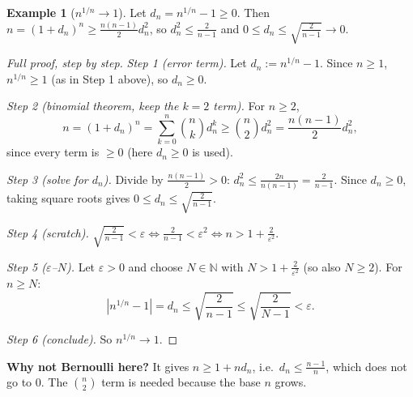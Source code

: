 \documentclass[11pt]{article}
\theoremstyle{definition}
\newtheorem{ex}[defn]{Example}
\newcommand{\N}{\mathbb{N}}
\newcommand{\eps}{\varepsilon}
\newcommand{\key}[1]{\textcolor{red!70!black}{\textbf{#1}}}
\begin{document}
\begin{ex}[$n^{1/n}\to1$]
Let $d_n=n^{1/n}-1\ge0$. Then $n=(1+d_n)^n\ge\frac{n(n-1)}2d_n^2$, so
$d_n^2\le\frac{2}{n-1}$ and $0\le d_n\le\sqrt{\frac2{n-1}}\to0$.

\begin{proof}[Full proof, step by step]
\emph{Step 1 (error term).} Let $d_n:=n^{1/n}-1$. Since $n\ge1$,
$n^{1/n}\ge1$ (as in Step 1 above), so $d_n\ge0$.

\emph{Step 2 (binomial theorem, keep the $k=2$ term).} For $n\ge2$,
\[
n=(1+d_n)^n=\sum_{k=0}^n\binom nk d_n^k\ge\binom n2d_n^2=\frac{n(n-1)}2d_n^2,
\]
since every term is $\ge0$ (here $d_n\ge0$ is used).

\emph{Step 3 (solve for $d_n$).} Divide by $\frac{n(n-1)}2>0$:
$d_n^2\le\frac{2n}{n(n-1)}=\frac2{n-1}$. Since $d_n\ge0$, taking square
roots gives $0\le d_n\le\sqrt{\frac2{n-1}}$.

\emph{Step 4 (scratch).}
$\sqrt{\frac2{n-1}}<\eps\iff\frac2{n-1}<\eps^2\iff n>1+\frac2{\eps^2}$.

\emph{Step 5 ($\eps$--$N$).} Let $\eps>0$ and choose $N\in\N$ with
$N>1+\frac2{\eps^2}$ (so also $N\ge2$). For $n\ge N$:
\[
|n^{1/n}-1|=d_n\le\sqrt{\frac2{n-1}}\le\sqrt{\frac2{N-1}}<\eps.
\]

\emph{Step 6 (conclude).} So $n^{1/n}\to1$.
\end{proof}
\noindent\key{Why not Bernoulli here?} It gives $n\ge1+nd_n$, i.e.\
$d_n\le\frac{n-1}n$, which does not go to $0$. The $\binom n2$ term is
needed because the base $n$ grows.
\end{ex}
\end{document}
